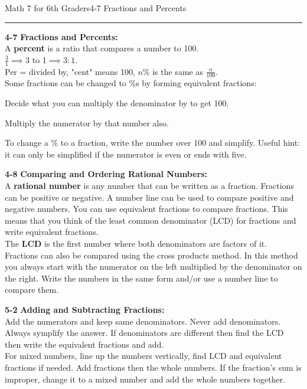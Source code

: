 \begin{enumerate*}
\noindent\Large{Math 7 for 6th Graders\hfill 4-7 Fractions and Percents}
\noindent\hrule
\vspace{5mm}

		\item[\Large\textbf{4-7}] \Large\textbf{Fractions and Percents:}\\
			A \textbf{percent} is a ratio that compares a number to 100.\\
			$\frac{3}{1}\implies$3 to 1$\implies3:1$.\\
			Per = divided by, "cent" means 100, $n\%$ is the same as $\frac{n}{100}$.\\
			Some fractions can be changed to \%s by forming equivalent fractions:
			\begin{enumerate*}
				\item Decide what you can multiply the denominator by to get 100.
				\item Multiply the numerator by that number also.
			\end{enumerate*}
			To change a \% to a fraction, write the number over 100 and simplify. Useful hint: it can only be simplified if the numerator is even or ends with five.\\

		\item[\Large\textbf{4-8}] \Large\textbf{Comparing and Ordering Rational Numbers:}\\
			A \textbf{rational number} is any number that can be written as a fraction. Fractions can be positive or negative. A number line can be used to compare positive and negative numbers. You can use equivalent fractions to compare fractions. This means that you think of the least common denominator (LCD) for fractions and write equivalent fractions.\\
			The \textbf{LCD} is the first number where both denominators are factors of it. Fractions can also be compared using the cross products method. In this method you always start with the numerator on the left multiplied by the denominator on the right. Write the numbers in the same form and/or use a number line to compare them.\\

		\item[\Large\textbf{5-2}] \Large\textbf{Adding and Subtracting Fractions:}\\
			 Add the numerators and keep same denominators. Never add denominators. Always symplify the answer. If denominators are different then find the LCD then write the equivalent fractions and add.\\
			For mixed numbers, line up the numbers vertically, find LCD and equivalent fractions if needed. Add fractions then the whole numbers. If the fraction's sum is improper, change it to a mixed number and add the whole numbers together.\\


\end{enumerate*}
